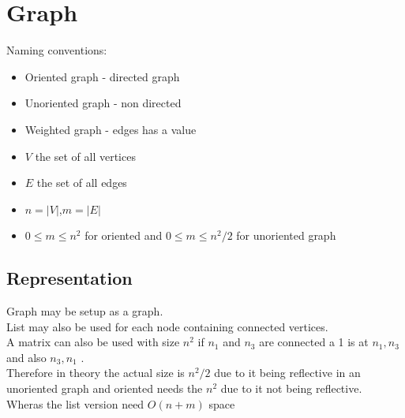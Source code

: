 \documentclass[12pt, a4paper]{article}
\begin{document}
	\section{Graph}
		Naming conventions:
		\begin{itemize}
			\item Oriented graph - directed graph
			\item Unoriented graph - non directed
			\item Weighted graph - edges has a value
			\item $V$ the set of all vertices
			\item $E$ the set of all edges
			\item $n=|V|$,$m=|E|$
			\item $0\leq m\leq n^2$ for oriented and $0\leq m \leq n^2/2$ for unoriented graph
		\end{itemize}
		\subsection{Representation}
			Graph may be setup as a graph.\\
			List may also be used for each node containing connected vertices.\\
			A matrix can also be used with size $n^2$ if $n_1$ and $n_3$ are connected a 1 is at $n_1,n_3$ and also $n_3,n_1$ .\\
			Therefore in theory the actual size is $n^2/2$ due to it being reflective in an unoriented graph and oriented needs the $n^2$ due to it not being reflective.\\
			Wheras the list version need $O(n+m)$ space
\end{document}
